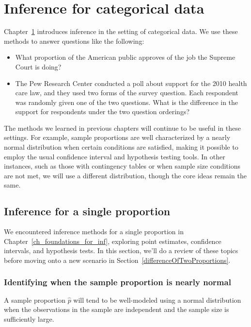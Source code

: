 \chapter{Inference for categorical data}
\label{inferenceForCategoricalData}
\label{ch_inference_for_props}
\renewcommand{\chapterfolder}{ch_inference_for_props}

Chapter~\ref{inferenceForCategoricalData} introduces inference in the setting of categorical data. We use these methods to answer questions like the following:
\begin{itemize}
\setlength{\itemsep}{0mm}
\item What proportion of the American public approves of the job the Supreme Court is doing?
\item The Pew Research Center conducted a poll about support for the 2010 health care law, and they used two forms of the survey question. Each respondent was randomly given one of the two questions. What is the difference in the support for respondents under the two question orderings?
\end{itemize}
The methods we learned in previous chapters will continue to be useful in these settings. For example, sample proportions are well characterized by a nearly normal distribution when certain conditions are satisfied, making it possible to employ the usual confidence interval and hypothesis testing tools. In other instances, such as those with contingency tables or when sample size conditions are not met, we will use a different distribution, though the core ideas remain the same.



\section{Inference for a single proportion}
\label{singleProportion}

We encountered inference methods for a single proportion
in Chapter~\ref{ch_foundations_for_inf},
exploring point estimates, confidence intervals,
and hypothesis tests.
In this section, we'll do a review of these topics
before moving onto a new scenario in
Section~\ref{differenceOfTwoProportions}.


\subsection{Identifying when the sample proportion is nearly normal}

A sample proportion $\hat{p}$ will tend to be well-modeled
using a normal distribution when the observations in the
sample are independent and the sample size is sufficiently
large.



